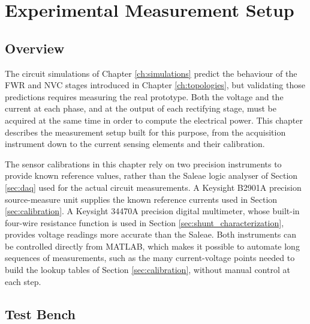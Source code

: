 \chapter{Experimental Measurement Setup}
\label{ch:measurement_setup}

\section{Overview}
\label{sec:measurement_overview}

The circuit simulations of Chapter \ref{ch:simulations} predict the behaviour of the FWR and NVC stages introduced in Chapter \ref{ch:topologies}, but validating those predictions requires measuring the real prototype. Both the voltage and the current at each phase, and at the output of each rectifying stage, must be acquired at the same time in order to compute the electrical power. This chapter describes the measurement setup built for this purpose, from the acquisition instrument down to the current sensing elements and their calibration.

The sensor calibrations in this chapter rely on two precision instruments to provide known reference values, rather than the Saleae logic analyser of Section \ref{sec:daq} used for the actual circuit measurements. A Keysight B2901A precision source-measure unit supplies the known reference currents used in Section \ref{sec:calibration}. A Keysight 34470A precision digital multimeter, whose built-in four-wire resistance function is used in Section \ref{sec:shunt_characterization}, provides voltage readings more accurate than the Saleae. Both instruments can be controlled directly from MATLAB, which makes it possible to automate long sequences of measurements, such as the many current-voltage points needed to build the lookup tables of Section \ref{sec:calibration}, without manual control at each step.


\section{Test Bench}
\label{sec:test_bench}

